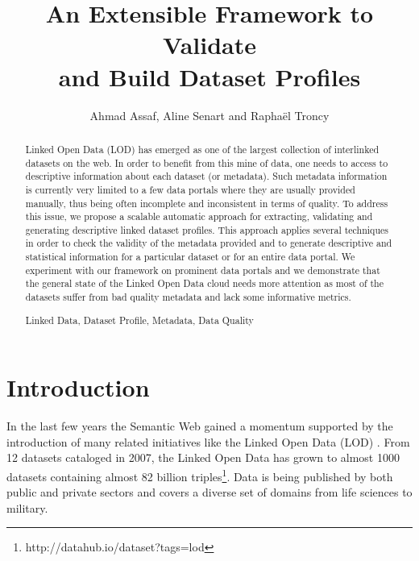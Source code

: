 \documentclass[runningheads,a4paper]{llncs}
\newcommand{\keywords}[1]{\par\addvspace\baselineskip
\noindent\keywordname\enspace\ignorespaces#1}
\begin{document}
\title{An Extensible Framework to Validate\\ and Build Dataset Profiles}

\author{Ahmad Assaf, Aline Senart and Rapha\"{e}l Troncy }



\maketitle


\begin{abstract}
Linked Open Data (LOD) has emerged as one of the largest collection of interlinked datasets on the web. In order to benefit from this mine of data, one needs to access to descriptive information about each dataset (or metadata). Such metadata information is currently very limited to a few data portals where they are usually provided manually, thus being often incomplete and inconsistent in terms of quality. To address this issue, we propose a scalable automatic approach for extracting, validating and generating descriptive linked dataset profiles. This approach applies several techniques in order to check the validity of the metadata provided and to generate descriptive and statistical information for a particular dataset or for an entire data portal. We experiment with our framework on prominent data portals and we demonstrate that the general state of the Linked Open Data cloud needs more attention as most of the datasets suffer from bad quality metadata and lack some informative metrics.
\keywords{Linked Data, Dataset Profile, Metadata, Data Quality}
\end{abstract}


\section{Introduction}
\label{sec:introduction}
In the last few years the Semantic Web gained a momentum supported by the introduction of many related initiatives like the Linked Open Data (LOD) \cite{BizerHeath2009}. From 12 datasets cataloged in 2007, the Linked Open Data has grown to almost 1000 datasets containing almost 82 billion triples\footnote{http://datahub.io/dataset?tags=lod}. Data is being published by both public and private sectors and covers a diverse set of domains from life sciences to military.
\end{document}
